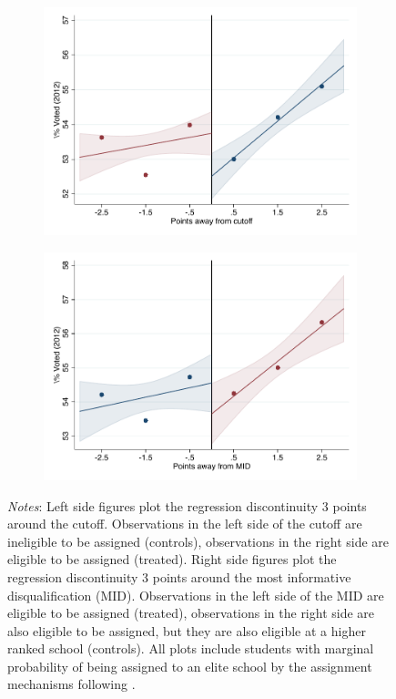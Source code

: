 \documentclass[oneside,11pt]{article}
\begin{document}
\begin{figure}[H]
\begin{center}
    \begin{subfigure}{0.475\textwidth}
        \centering
        \includegraphics[width=\textwidth]{04_Figures/rd_plot_tau_Voto_Marcado_2012_UNAM3.pdf}
    \end{subfigure}
    \begin{subfigure}{0.475\textwidth}
        \centering
        \includegraphics[width=\textwidth]{04_Figures/rd_plot_mid_Voto_Marcado_2012_UNAM3.pdf}
    \end{subfigure}
    \end{center}
    
\footnotesize
\textit{Notes}: Left side figures plot the regression discontinuity 3 points around the cutoff. Observations in the left side of the cutoff are ineligible to be assigned (controls), observations in the right side are eligible to be assigned (treated). Right side figures plot the regression discontinuity 3 points around the most informative disqualification (MID). Observations in the left side of the MID are eligible to be assigned (treated), observations in the right side are also eligible to be assigned, but they are also eligible at a higher ranked school (controls). All plots include students with marginal probability of being assigned to an elite school by the assignment mechanisms following \citet{abdulkadirouglu2022breaking}. 
\end{figure}
\end{document}
